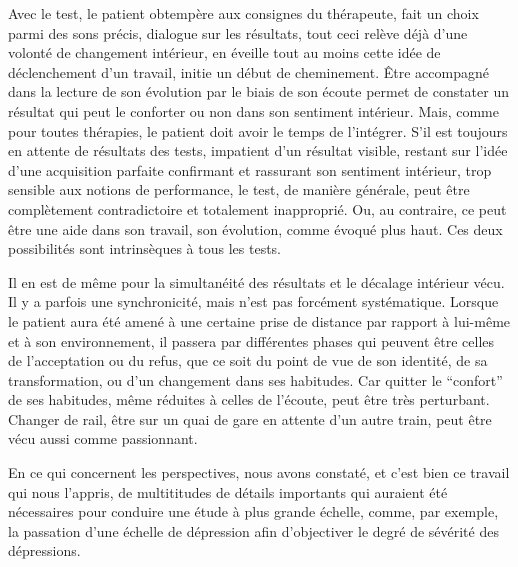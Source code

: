         Avec le test, le patient obtempère aux consignes du thérapeute, fait un choix parmi des sons précis, dialogue sur les résultats, tout ceci relève déjà d'une volonté de changement intérieur, en  éveille tout au moins cette idée de déclenchement d'un travail, initie un début de cheminement.
Être accompagné dans la lecture de son évolution par le biais de
son écoute  permet de constater un résultat qui  peut le conforter ou non dans son sentiment intérieur.
Mais, comme pour toutes thérapies, le patient doit avoir le temps de
l'intégrer. S'il est toujours en
attente de résultats des tests, impatient d'un résultat visible,
restant sur l'idée d'une acquisition parfaite confirmant et rassurant son
sentiment intérieur, trop sensible aux notions de performance,
le test, de manière générale, peut être complètement
contradictoire et totalement inapproprié. Ou, au contraire, ce peut être une aide dans son travail,
son évolution, comme évoqué plus haut. Ces deux possibilités sont
intrinsèques à tous les tests.

Il en est de même pour la simultanéité des
résultats et le décalage intérieur vécu. Il y a parfois une
synchronicité, mais n'est pas forcément systématique.
Lorsque le patient aura été amené à une certaine prise de distance par rapport à
lui-même et à son environnement, il passera par différentes phases qui
peuvent être celles de l'acceptation ou du refus, que ce soit du point
de vue de son
identité, de sa transformation, ou d'un changement dans ses
habitudes. Car quitter le ``confort'' de ses habitudes, même réduites
à celles de l'écoute, peut être très perturbant. Changer de rail, être
sur un quai de gare
en attente d'un autre train, peut être vécu aussi comme passionnant.






En ce qui concernent les perspectives, nous  avons constaté, et c'est
bien 
ce travail qui nous l'appris, de multititudes de détails importants
qui
auraient été nécessaires pour conduire une étude à plus grande
échelle, comme, par exemple, la passation d'une échelle de
     dépression afin d'objectiver le degré de sévérité des
     dépressions.

